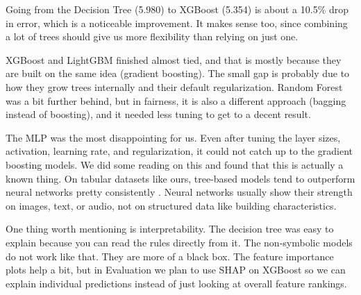 \documentclass[11pt,a4paper]{article}
\begin{document}
Going from the Decision Tree (5.980) to XGBoost (5.354) is about a 10.5\% drop in error, which is a noticeable improvement. It makes sense too, since combining a lot of trees should give us more flexibility than relying on just one.
 
XGBoost and LightGBM finished almost tied, and that is mostly because they are built on the same idea (gradient boosting). The small gap is probably due to how they grow trees internally and their default regularization. Random Forest was a bit further behind, but in fairness, it is also a different approach (bagging instead of boosting), and it needed less tuning to get to a decent result.
 
The MLP was the most disappointing for us. Even after tuning the layer sizes, activation, learning rate, and regularization, it could not catch up to the gradient boosting models. We did some reading on this and found that this is actually a known thing. On tabular datasets like ours, tree-based models tend to outperform neural networks pretty consistently \parencite{grinsztajn2022tree}. Neural networks usually show their strength on images, text, or audio, not on structured data like building characteristics.
 
One thing worth mentioning is interpretability. The decision tree was easy to explain because you can read the rules directly from it. The non-symbolic models do not work like that. They are more of a black box. The feature importance plots help a bit, but in Evaluation we plan to use SHAP on XGBoost so we can explain individual predictions instead of just looking at overall feature rankings.
 
\printbibliography
 
\end{document}
